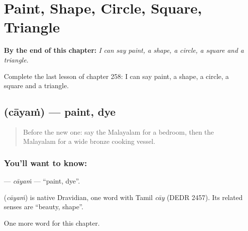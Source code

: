 
\chapter{Paint, Shape, Circle, Square, Triangle}
\label{ch:ml-paint-shape-circle-square-triangle}

\begin{chapteropening}
\textbf{By the end of this chapter:} \emph{I can say paint, a shape, a circle, a square and a triangle.}

Complete the last lesson of chapter 258: I can say paint, a shape, a circle, a square and a triangle.
\end{chapteropening}

\section[\texorpdfstring{\ml{ചായം} (cāyaṁ)}{ചായം (cāyaṁ)}]{ (cāyaṁ) — paint, dye}

\label{lesson:ML-C258-cayam}



\begin{quote}
Before the new one: say the Malayalam for a bedroom, then the Malayalam for a wide bronze cooking vessel.
\end{quote}

\subsection*{You'll want to know: }
\textbf{} — \emph{cāyaṁ} — \textquotedblleft{}paint, dye\textquotedblright{}.

\begin{cousinweb}
\textbf{} (\emph{cāyaṁ}) is native Dravidian, one word with Tamil \emph{cāy} (DEDR 2457). Its related senses are \textquotedblleft{}beauty, shape\textquotedblright{}.
\end{cousinweb}

\begin{grammarlens}[title={What you've built}]
One more word for this chapter.
\end{grammarlens}

